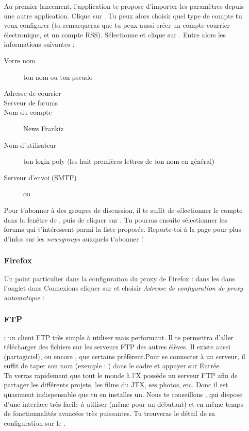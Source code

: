 Au premier lancement, l'application te propose d'importer les paramètres depuis une autre application. Clique sur . Tu peux alors choisir quel type de compte tu veux configurer (tu remarqueras que tu peux aussi créer un compte courrier électronique, et un compte RSS). Sélectionne  et clique sur . Entre alors les informations suivantes :

\begin{description}
  \item[Votre nom] ton nom ou ton pseudo
  \item[Adresse de courrier] 
  \item[Serveur de forums] 
  \item[Nom du compte] News Frankiz
  \item[Nom d'utilisateur] ton login poly (les huit premières lettres de ton nom en général)
  \item[Serveur d'envoi (SMTP)]  ou 
\end{description}


Pour t'abonner à des groupes de discussion, il te suffit de sélectionner le compte  dans la fenêtre  de , puis de cliquer sur . Tu pourras ensuite sélectionner les forums qui t'intéressent parmi la liste proposée. Reporte-toi à la page \pageref{newsgroups} pour plus d'infos sur les \emph{newsgroups} auxquels t'abonner !

\subsubsection{Firefox}
Un point particulier dans la configuration du proxy de Firefox : dans les  dans l'onglet  dans Connexions cliquer sur  et choisir \emph{Adresse de configuration de proxy automatique} : 

\subsubsection{FTP}

  : un client FTP très simple à utiliser mais performant. Il te permettra d'aller télécharger des fichiers sur les serveurs FTP des autres élèves. Il existe aussi  (partagiciel), ou encore , que certains préfèrent.Pour se connecter à un serveur, il suffit de taper son nom (exemple : ) dans le cadre  et appuyer sur Entrée.\\
Tu verras rapidement que tout le monde à l'X possède un serveur FTP afin de partager les différents projets, les films du JTX, ses photos, etc. Donc il est quasiment indispensable que tu en installes un. Nous te conseillons , qui dispose d'une interface très facile à utiliser (même pour un débutant) et en même temps de fonctionnalités avancées très puissantes. Tu trouveras le détail de sa configuration sur le .

